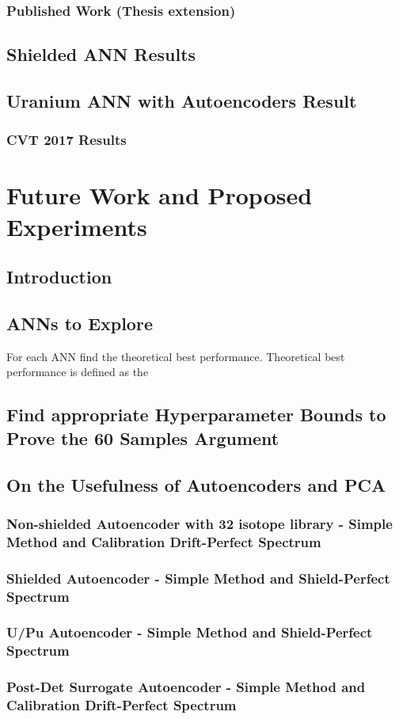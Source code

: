 \documentclass[thesis,tocnosub,noragright,centerchapter,12pt,fullpage]{uiucecethesis09}
\begin{document}
\subsection{Published Work (Thesis extension)}


\section{Shielded ANN Results}


\section{Uranium ANN with Autoencoders Result}

\subsection{CVT 2017 Results}




\chapter{Future Work and Proposed Experiments}


\section{Introduction}


\section{ANNs to Explore}

For each ANN find the theoretical best performance. Theoretical best performance is defined as the 



\section{Find appropriate Hyperparameter Bounds to Prove the 60 Samples Argument}

\section{On the Usefulness of Autoencoders and PCA}

\subsection{Non-shielded Autoencoder with 32 isotope library - Simple Method and Calibration Drift-Perfect Spectrum}

\subsection{Shielded Autoencoder - Simple Method and Shield-Perfect Spectrum}

\subsection{U/Pu Autoencoder - Simple Method and Shield-Perfect Spectrum}

\subsection{Post-Det Surrogate Autoencoder - Simple Method and Calibration Drift-Perfect Spectrum}
\end{document}
